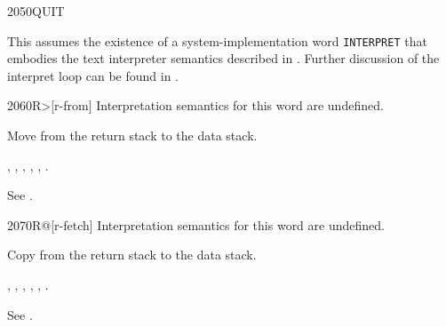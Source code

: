 \begin{worddef}{2050}{QUIT}
\begin{implement}
		\dffamily
		This assumes the existence of a system-implementation word
		\texttt{INTERPRET} that embodies the text interpreter semantics
		described in .
		Further discussion of the interpret loop can be found in
		.
	\end{implement}
\end{worddef}


\begin{worddef}[Rfrom]{2060}{R>}[r-from]
\interpret
	Interpretation semantics for this word are undefined.

\execute

	Move  from the return stack to the data stack.

\see {},
	,
	,
	,
	,
	.

	\begin{testing} %
		See .
	\end{testing}
\end{worddef}


\begin{worddef}{2070}{R@}[r-fetch]
\interpret
	Interpretation semantics for this word are undefined.

\execute

	Copy  from the return stack to the data stack.

\see {},
	,
	,
	,
	,
	.

	\begin{testing} %
		See .
	\end{testing}
\end{worddef}



